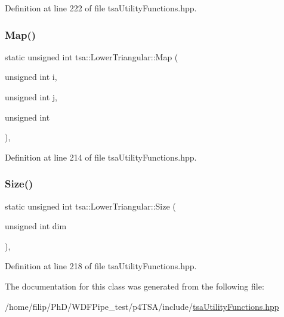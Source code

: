 Definition at line 222 of file tsa\+Utility\+Functions.\+hpp.

\mbox{\label{classtsa_1_1_lower_triangular_a968298d0e21e8eff3959fe9eb69eee8a}} 
\subsubsection{\texorpdfstring{Map()}{Map()}}
{\footnotesize\ttfamily static unsigned int tsa\+::\+Lower\+Triangular\+::\+Map (\begin{DoxyParamCaption}\item[{unsigned int}]{i,  }\item[{unsigned int}]{j,  }\item[{unsigned}]{int }\end{DoxyParamCaption})\hspace{0.3cm}{\ttfamily [inline]}, {\ttfamily [static]}}



Definition at line 214 of file tsa\+Utility\+Functions.\+hpp.

\mbox{\label{classtsa_1_1_lower_triangular_a553ac56eb5320ef223c61951290429d0}} 
\subsubsection{\texorpdfstring{Size()}{Size()}}
{\footnotesize\ttfamily static unsigned int tsa\+::\+Lower\+Triangular\+::\+Size (\begin{DoxyParamCaption}\item[{unsigned int}]{dim }\end{DoxyParamCaption})\hspace{0.3cm}{\ttfamily [inline]}, {\ttfamily [static]}}



Definition at line 218 of file tsa\+Utility\+Functions.\+hpp.



The documentation for this class was generated from the following file\+:\begin{DoxyCompactItemize}
\item 
/home/filip/\+Ph\+D/\+W\+D\+F\+Pipe\+\_\+test/p4\+T\+S\+A/include/\hyperlink{tsa_utility_functions_8hpp}{tsa\+Utility\+Functions.\+hpp}\end{DoxyCompactItemize}
